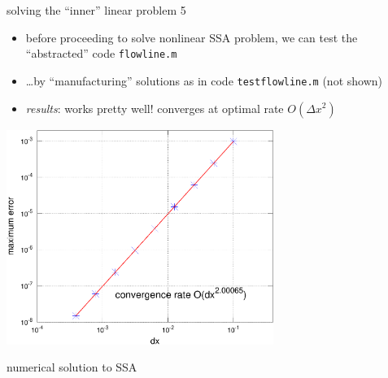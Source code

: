 \begin{frame}{solving the ``inner'' linear problem 5}

\begin{itemize}
\item before proceeding to solve nonlinear SSA problem, we can test the ``abstracted'' code \texttt{flowline.m}
\item \dots by ``manufacturing'' solutions as in code \texttt{testflowline.m} \quad \scriptsize (not shown) \normalsize
\item \emph{results}: \quad works pretty well! converges at optimal rate $O(\Delta x^2)$
\end{itemize}

\begin{center}
  \includegraphics[width=0.65\textwidth]{photos/convanalysis}
\end{center}
\end{frame}


\begin{frame}{numerical solution to SSA}

\end{frame}


